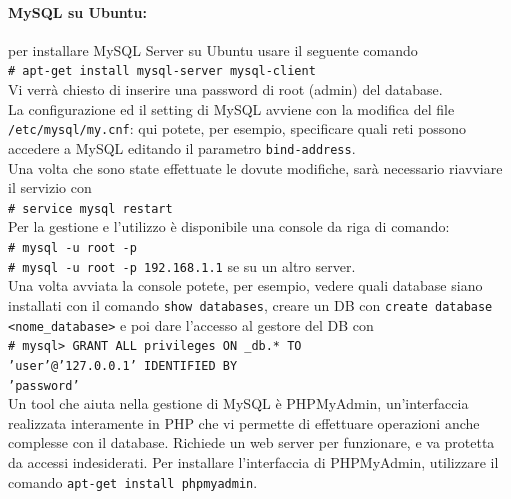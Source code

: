 \documentclass[a4paper]{report}
\newcommand\tab[1][1cm]{\hspace*{#1}}
\begin{document}
\paragraph{MySQL su Ubuntu:} per installare MySQL Server su Ubuntu usare il seguente comando\\
\tab\texttt{\# apt-get install mysql-server mysql-client}\\
Vi verrà chiesto di inserire una password di root (admin) del database.\\
La configurazione ed il setting di MySQL avviene con la modifica del file \texttt{/etc/mysql/my.cnf}: qui potete, per esempio, specificare quali reti possono accedere a MySQL editando il parametro \texttt{bind-address}.\\
Una volta che sono state effettuate le dovute modifiche, sarà necessario riavviare il servizio con\\
\tab\texttt{\# service mysql restart}\\
Per la gestione e l'utilizzo è disponibile una console da riga di comando:\\
\tab\texttt{\# mysql -u root -p}\\
\tab\texttt{\# mysql -u root -p 192.168.1.1} se su un altro server.\\
Una volta avviata la console potete, per esempio, vedere quali database siano installati con il comando \texttt{show databases}, creare un DB con \texttt{create database <nome\_database>} e poi dare l'accesso al gestore del DB con\\
\tab\texttt{\# mysql> GRANT ALL privileges ON \_db.* TO}\\
\tab\texttt{'user'@'127.0.0.1' IDENTIFIED BY}\\
\tab\texttt{'password'}\\
Un tool che aiuta nella gestione di MySQL è PHPMyAdmin, un'interfaccia realizzata interamente in PHP che vi permette di effettuare operazioni anche complesse con il database. Richiede un web server per funzionare, e va protetta da accessi indesiderati. Per installare l'interfaccia di PHPMyAdmin, utilizzare il comando \texttt{apt-get install phpmyadmin}.\\
\end{document}
